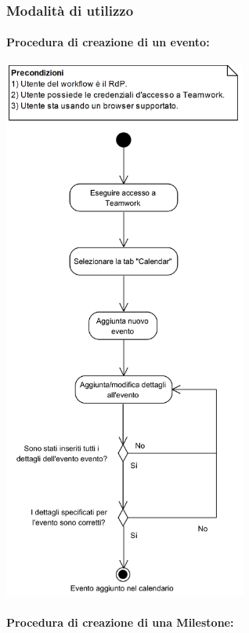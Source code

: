 \newpage
\subsubsection{Modalità di utilizzo} \label{sec:procedure_teamwork}

\paragraph{Procedura di creazione di un evento:}

\begin{center}
	\includegraphics[width=8cm]{../../documenti/NormeDiProgetto/DiagrammiProcedure/CreazioneEventoNelCalendario.png}
\end{center}

\paragraph{Procedura di creazione di una Milestone:}


